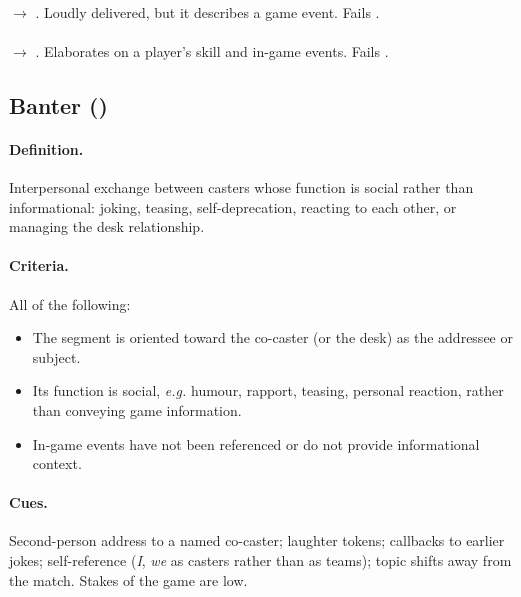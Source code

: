 \begin{agexample}
\\[2pt]
\hspace*{1em}$\rightarrow$ \PBP{}. Loudly delivered, but it describes a game event. Fails .\\[4pt]
\\
\hspace*{1em}$\rightarrow$ \STO{}. Elaborates on a player's skill and in-game events. Fails .
\end{agexample}

\subsection{Banter (\cBAN{})}
\label{sec:def-ban}

\paragraph{Definition.} Interpersonal exchange between casters whose function is social rather than informational: joking, teasing, self-deprecation, reacting to each other, or managing the desk relationship.

\paragraph{Criteria.} All of the following:
\begin{itemize}
  \item The segment is oriented toward the co-caster (or the desk) as the addressee or subject.
  \item Its function is social, \textit{e.g.} humour, rapport, teasing, personal reaction, rather than conveying game information. 
  \item In-game events have not been referenced or do not provide informational context.
\end{itemize}

\paragraph{Cues.} Second-person address to a named co-caster; laughter tokens; callbacks to earlier jokes; self-reference (\emph{I}, \emph{we} as casters rather than as teams); topic shifts away from the match. Stakes of the game are low.

